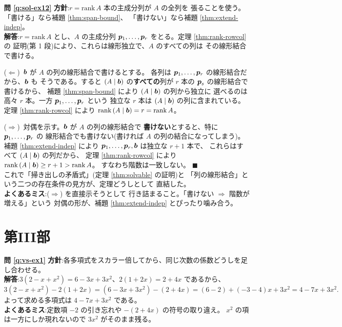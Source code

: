 \bigskip
\noindent\textbf{問 \ref{q:sol-ex12}}\quad
\textbf{方針}:$r = \mathrm{rank}\,A$ 本の主成分列が $A$ の全列を
張ることを使う。「書ける」なら補題 \ref{thm:span-bound}、
「書けない」なら補題 \ref{thm:extend-indep}。\\
\textbf{解答}:$r = \mathrm{rank}\,A$ とし、$A$ の主成分列
$\bm{p}_1, \dots, \bm{p}_r$ をとる。定理 \ref{thm:rank-rowcol} の
証明(第 1 段)により、これらは線形独立で、$A$ のすべての列は
その線形結合で書ける。

($\Leftarrow$)\ $\bm{b}$ が $A$ の列の線形結合で書けるとする。
各列は $\bm{p}_1, \dots, \bm{p}_r$ の線形結合だから、$\bm{b}$ も
そうである。すると $(A \mid \bm{b})$ の\textbf{すべての}列が
$r$ 本の $\bm{p}_s$ の線形結合で書けるから、
補題 \ref{thm:span-bound} により $(A \mid \bm{b})$ の列から独立に
選べるのは高々 $r$ 本。一方 $\bm{p}_1, \dots, \bm{p}_r$ という
独立な $r$ 本は $(A \mid \bm{b})$ の列に含まれている。
定理 \ref{thm:rank-rowcol} により
$\mathrm{rank}\,(A \mid \bm{b}) = r = \mathrm{rank}\,A$。

($\Rightarrow$)\ 対偶を示す。$\bm{b}$ が $A$ の列の線形結合で
\textbf{書けない}とすると、特に $\bm{p}_1, \dots, \bm{p}_r$ の
線形結合でも書けない(書ければ $A$ の列の結合になってしまう)。
補題 \ref{thm:extend-indep} により
$\bm{p}_1, \dots, \bm{p}_r, \bm{b}$ は独立な $r + 1$ 本で、
これらはすべて $(A \mid \bm{b})$ の列だから、
定理 \ref{thm:rank-rowcol} により
$\mathrm{rank}\,(A \mid \bm{b}) \ge r + 1 > \mathrm{rank}\,A$。
すなわち階数は一致しない。 $\blacksquare$\\
これで「掃き出しの矛盾式」(定理 \ref{thm:solvable} の証明)と
「列の線形結合」という二つの存在条件の見方が、定理どうしとして
直結した。\\
\textbf{よくあるミス}:($\Rightarrow$) を直接示そうとして
行き詰まること。「書けない $\Rightarrow$ 階数が増える」という
対偶の形が、補題 \ref{thm:extend-indep} とぴったり噛み合う。

\section*{第III部}

\noindent\textbf{問 \ref{q:vs-ex1}}\quad
\textbf{方針}:各多項式をスカラー倍してから、同じ次数の係数どうしを足し合わせる。\\
\textbf{解答}:$3(2 - x + x^2) = 6 - 3x + 3x^2$、$2(1 + 2x) = 2 + 4x$ であるから、
\[
3(2 - x + x^2) - 2(1 + 2x) = (6 - 3x + 3x^2) - (2 + 4x)
= (6 - 2) + (-3 - 4)x + 3x^2 = 4 - 7x + 3x^2.
\]
よって求める多項式は $4 - 7x + 3x^2$ である。\\
\textbf{よくあるミス}:定数項 $-2$ の引き忘れや $-(2 + 4x)$ の符号の取り違え。
$x^2$ の項は一方にしか現れないので $3x^2$ がそのまま残る。

